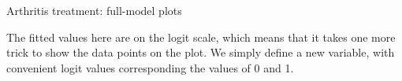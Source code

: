\documentclass[11pt]{book}
\renewenvironment{knitrout}{\small\renewcommand{\baselinestretch}{.85}}{} %
\begin{document}
\begin{Example}{Arthritis treatment: full-model plots}
\begin{knitrout}
\color{fgcolor}\begin{kframe}
\begin{alltt}
 \hlkwb{<-} 
                    \hlstd{=} \hlstd{))}
\end{alltt}
\end{kframe}
\end{knitrout}
The fitted values here are on the logit scale, which means that it takes one more
trick to show the data points on the plot.  We simply define a new variable,
 with convenient logit values corresponding the  values
of 0 and 1.
\begin{knitrout}
\color{fgcolor}\begin{kframe}
\begin{alltt}
\hlopt{$} \hlkwb{<-} \hlstd{(}\hlopt{-}\hlstd{,} \hlstd{)[}\hlopt{+}\hlopt{$}\hlstd{Better]}
\end{alltt}
\end{kframe}
\end{knitrout}


\end{Example}
\end{document}
